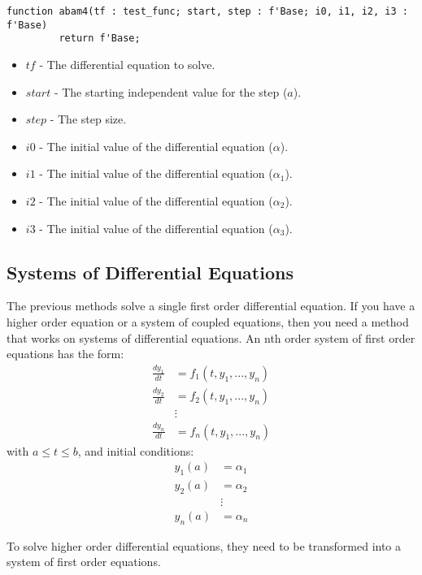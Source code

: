 \documentclass[10pt, openany]{book}
\begin{document}
\begin{lstlisting}
function abam4(tf : test_func; start, step : f'Base; i0, i1, i2, i3 : f'Base)
         return f'Base;
\end{lstlisting}
\begin{itemize}
  \item $tf$ - The differential equation to solve.
  \item $start$ - The starting independent value for the step ($a$).
  \item $step$ - The step size.
  \item $i0$ - The initial value of the differential equation ($\alpha$).
  \item $i1$ - The initial value of the differential equation ($\alpha_1$).
  \item $i2$ - The initial value of the differential equation ($\alpha_2$).
  \item $i3$ - The initial value of the differential equation ($\alpha_3$).
\end{itemize}

\subsection{Systems of Differential Equations}
The previous methods solve a single first order differential equation.  If you have a higher order equation or a system of coupled equations, then you need a method that works on systems of differential equations.  An nth order system of first order equations has the form:
\begin{align*}
  \frac{dy_1}{dt} &= f_1(t, y_1, ..., y_n) \\
  \frac{dy_2}{dt} &= f_2(t, y_1, ..., y_n) \\
  &\vdots\\
  \frac{dy_n}{dt} &= f_n(t, y_1, ..., y_n)
\end{align*}
with $a\leq t\leq b$, and initial conditions:
\begin{align*}
  y_1(a) &= \alpha_1 \\
  y_2(a) &= \alpha_2 \\
  &\vdots \\
  y_n(a) &= \alpha_n
\end{align*}

To solve higher order differential equations, they need to be transformed into a system of first order equations.
\end{document}
